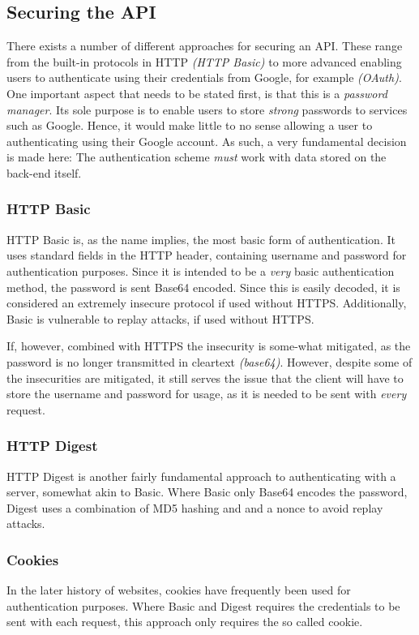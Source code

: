 		\subsection{Securing the API}
			There exists a number of different approaches for securing an API. These range from the built-in protocols in HTTP \emph{(HTTP Basic)} to more advanced enabling users to authenticate using their credentials from Google, for example \emph{(OAuth)}. One important aspect that needs to be stated first, is that this is a \emph{password manager}. Its sole purpose is to enable users to store \emph{strong} passwords to services such as Google. Hence, it would make little to no sense allowing a user to authenticating using their Google account. As such, a very fundamental decision is made here: The authentication scheme \emph{must} work with data stored on the back-end itself.

			\subsubsection{HTTP Basic}
				HTTP Basic is, as the name implies, the most basic form of authentication. It uses standard fields in the HTTP header, containing username and password for authentication purposes. Since it is intended to be a \emph{very} basic authentication method, the password is sent Base64 encoded. Since this is easily decoded, it is considered an extremely insecure protocol if used without HTTPS. Additionally, Basic is vulnerable to replay attacks, if used without HTTPS.

				If, however, combined with HTTPS the insecurity is some-what mitigated, as the password is no longer transmitted in cleartext \emph{(base64)}. However, despite some of the insecurities are mitigated, it still serves the issue that the client will have to store the username and password for usage, as it is needed to be sent with \emph{every} request.

			\subsubsection{HTTP Digest}
				HTTP Digest is another fairly fundamental approach to authenticating with a server, somewhat akin to Basic. Where Basic only Base64 encodes the password, Digest uses a combination of MD5 hashing and and a nonce to avoid replay attacks. 

			\subsubsection{Cookies}
				In the later history of websites, cookies have frequently been used for authentication purposes. Where Basic and Digest requires the credentials to be sent with each request, this approach only requires the so called cookie.


